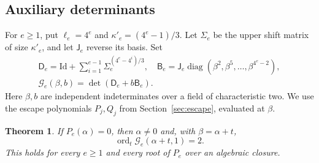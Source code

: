 \documentclass[11pt,a4paper,reqno]{amsart}
\numberwithin{equation}{section}
\theoremstyle{plain}
\newtheorem{theorem}{Theorem}[section]
\theoremstyle{definition}
\theoremstyle{remark}
\newcommand{\Id}{\mathrm{Id}}
\DeclareMathOperator{\diag}{diag}
\DeclareMathOperator{\ord}{ord}
\begin{document}
\subsection{Auxiliary determinants}
For $e\geq1$, put $\ell_e=4^e$ and $\kappa'_e=(4^e-1)/3$.
Let $\Sigma_e$ be the upper shift matrix of size $\kappa'_e$, and let
$\mathsf J_e$ reverse its basis. Set
\[
\begin{gathered}\mathsf D_e=\Id+\sum_{i=1}^{e-1}\Sigma_e^{(4^e-4^i)/3},\quad
\mathsf B_e=\mathsf J_e\diag(\beta^2,\beta^5,\ldots,\beta^{4^e-2}),\\
\mathcal G_e(\beta,b)=\det(\mathsf D_e+b\mathsf B_e).\end{gathered}
\]
Here $\beta,b$ are independent indeterminates over a field of
characteristic two. We use the escape polynomials $P_j,Q_j$ from
Section~\ref{sec:escape}, evaluated at $\beta$.
\begin{theorem}
If $P_e(\alpha)=0$, then $\alpha\ne0$ and, with $\beta=\alpha+t$,
\[
\ord_t\mathcal G_e(\alpha+t,1)=2.
\]
This holds for every $e\geq1$ and every root of $P_e$ over an algebraic closure.
\end{theorem}
\end{document}
